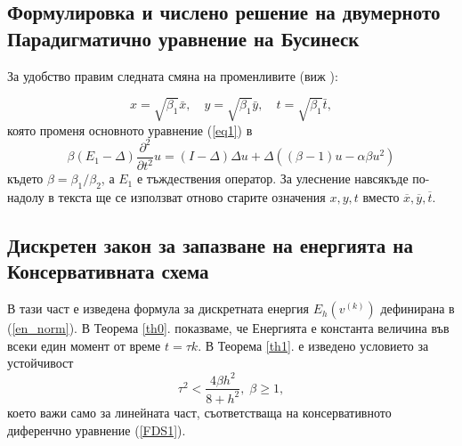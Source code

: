 \documentclass[a4paper]{article}
\newcommand{\be}{\begin{equation}}
\newcommand{\ee}{\end{equation}}
\newcommand{\rf}[1]{(\ref{#1})}
\theoremstyle{remark}
\begin{document}
\begin{large}
\newpage
\section{Формулировка и числено решение на двумерното Парадигматично уравнение на Бусинеск}\label{hiperbolicFormulation}

За удобство правим следната смяна на променливите (виж \cite{ref25}):

\be\label{vcHyp}
x = \sqrt{\beta_1} \bar{x}, \quad y = \sqrt{\beta_1} \bar{y}, \quad t = \sqrt{\beta_1} \bar{t} ,
\ee
която променя основното уравнение \rf{eq1} в
\be\label{problemVC}
 \beta (E_1-\Delta) \frac{\partial^2}{\partial t^2}u= 
(I-\Delta)\Delta u +\Delta( (\beta - 1 )u - \alpha \beta u^2 )
\ee
където $\beta = \beta_1/\beta_2$, а $E_1$ е тъждествения оператор. За улеснение навсякъде по-надолу в текста ще се използват отново старите означения $x,y,t$ вместо ${\overline x},{\overline y},{\overline t}$.

\subsection{Дискретен закон за запазване на енергията на Консервативната схема}\label{discreteLawsEn}
В тази част е изведена формула за дискретната енергия $E_h(v^{(k)})$ дефинирана в \rf{en_norm}. В Теорема \ref{th0}. показваме, че Енергията е константа величина във всеки един момент от време $t=\tau k$. В Теорема \ref{th1}. е изведено условието за устойчивост
\be
\tau^2 < \frac{ 4 \beta h^2 } { 8 + h^2}, \; \beta \ge 1,
\ee 
което важи само за линейната част, съответстваща на консервативното диференчно уравнение \rf{FDS1}.


\end{large}
\end{document}

